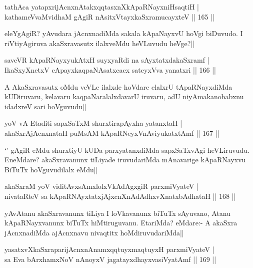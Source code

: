 \begin{shl}
tathAca yatapxrijAcnxnAtakxqqtasxnXkApaRNayxniHsaqtiH |\\
kathameVvaMvidhaM gAgiR nAsitxVtayxkaSxramucayxteV \hfill || 165 ||
\end{shl}

\begin{artha}
eleYgAgiR? yAvudara jAcnxnadiMda sakala kApaNayxvU hoVgi biDuvudo. I riVtiyAgiruva akaSxravasutx ilalxveMdu heVLuvudu heVge?||
\end{artha}

\begin{shl}
saveVR kApaRNayxyukAtxH suyxyaRdi na sAyxtatxdakaSxramf |\\
IkaSxyXnetxV cApayxkaqpaNAsatxcacx sateyxVva yanatxri \hfill || 166 ||
\end{shl}

\begin{artha}
A AkaSxravasutx oMdu veVLe ilalxde hoVdare elalxrU tApaRNayxdiMda kUDiruvaru, kelavaru kaqpaNaralalxdavarU iruvaru, adU niyAmakanobabxnu idadxreV sari hoVguvudu||
\end{artha}

\begin{shl}
yoV vA Etaditi sapxSaTxM shurxtirapAyxha yatanxtaH |\\
akaSxrAjAcnxnataH puMsAM kApaRNeyxVnAviyukatxtAmf \hfill || 167 ||
\end{shl}

\begin{artha}
`\stext ' gAgiR eMdu shurxtiyU kUDa parxyatanxdiMda sapxSaTxvAgi heVLiruvudu. EneMdare? akaSxravanunx tiLiyade iruvudariMda mAnavarige kApaRNayxvu BiTuTx hoVguvudilalx eMdu||
\end{artha}

\begin{shl}
akaSxraM yoV viditAvx\s sAmxlolxVkAdAgxgiR parxmiVyateV |\\
nivataRteV sa kApaRNAyxtatxjAjxcnXnAdAdhxvXnatxbAdhataH \hfill || 168 ||
\end{shl}

\begin{artha}%
yAvAtanu akaSxravanunx tiLiya I loVkavanunx biTuTx sAyuvano, Atanu kApaRNayxvanunx biTuTx hiMtiruguvanu. EtariMda? eMdare:- A akaSxra jAcnxnadiMda ajAcnxnavu nivaqtitx hoMdiruvudariMda||
\end{artha}

\begin{shl}
yasatxvXkaSxraparijAcnxnAnamxqqtuyxmaqtuyxH parxmiVyateV |\\
sa Eva bArxhamxNoV nAnoyxV jagatayxdhayxvasiVyatAmf \hfill || 169 ||
\end{shl}

